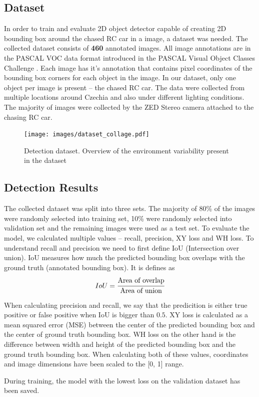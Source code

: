 \subsection{Dataset} \label{s:detection_dataset}
In order to train and evaluate 2D object detector capable of creating 2D bounding box around the chased RC car in a image, a dataset was needed. The collected dataset consists of \textbf{460} annotated images. All image annotations are in the PASCAL VOC data format introduced in the PASCAL Visual Object Classes Challenge \cite{pascal-voc}. Each image has it's annotation that contains pixel coordinates of the bounding box corners for each object in the image. In our dataset, only one object per image is present -- the chased RC car. The data were collected from multiple locations around Czechia and also under different lighting conditions. The majority of images were collected by the ZED Stereo camera attached to the chasing RC car. 

\begin{figure}[h!]
    \centering
    \texttt{[image: images/dataset\_collage.pdf]}
    
    \caption{Detection dataset. Overview of the environment variability present in the dataset}\label{f:dataset_detection}
\end{figure}


\subsection{Detection Results}
The collected dataset was split into three sets. The majority of 80\% of the images were randomly selected into training set, 10\% were randomly selected into validation set and the remaining images were used as a test set. To evaluate the model, we calculated multiple values -- recall, precision, XY loss and WH loss. To understand recall and precision we need to first define IoU (Intersection over union). IoU measures how much the predicted bounding box overlaps with the ground truth (annotated bounding box). It is defines as 
\begin{equation}IoU = \cfrac{\textrm{Area of overlap}}{\textrm{Area of union}}\end{equation}

When calculating precision and recall, we say that the predicition is either true positive or false positive when IoU is bigger than $0.5$. XY loss is calculated as a mean squared error (MSE) between the center of the predicted bounding box and the center of ground truth bounding box. WH loss on the other hand is the difference between width and height of the predicted bounding box and the ground truth bounding box. When calculating both of these values, coordinates and image dimensions have been scaled to the [0, 1] range. \par
During training, the model with the lowest loss on the validation dataset has been saved.

